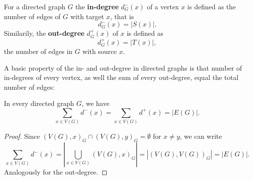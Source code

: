 \begin{definition}  
  \label{def:in_out_degree}
  For a directed graph $G$ the \textbf{in-degree} $d^-_G(x)$ of a
  vertex $x$ is defined as the number of edges of $G$ with target $x$,
  that is
  \[
  d^-_G(x) = \left|S(x)\right|.
  \]
  Similarily, the \textbf{out-degree} $d^+_G(x)$ of $x$ is defined as
  \[
  d^+_G(x) = \left|T(x)\right|,
  \]
  the number of edges in $G$ with source $x$.
\end{definition}

A basic property of the in- and out-degree in directed graphs is that
number of in-degrees of every vertex, as well the sum of every
out-degree, equal the total number of edges:

\begin{proposition}
  In every directed graph $G$, we have
  \[
  \sum_{x \in V(G)} d^-(x) = \sum_{x \in V(G)} d^+(x) = | E(G) |.
  \]
\end{proposition}

\begin{proof}
  Since $(V(G),x)_G \cap (V(G),y)_G = \emptyset$ for $x \ne y$, we can
  write
  \[
  \sum_{x \in V(G)} d^-(x) = \left| \bigcup_{x \in V(G)} (V(G),x)_G
  \right| = \left| (V(G),V(G))_G \right| = | E(G) |.
  \]
  Analogously for the out-degree.
\end{proof}


